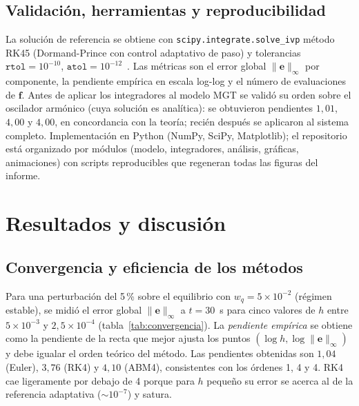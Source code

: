 \documentclass[10pt,a4paper]{article}
\begin{document}
\subsection{Validación, herramientas y reproducibilidad}

La solución de referencia se obtiene con
\texttt{scipy.integrate.solve\_ivp} método RK45 (Dormand-Prince con
control adaptativo de paso) y tolerancias $\texttt{rtol}=10^{-10}$,
$\texttt{atol}=10^{-12}$~\cite{scipy}. Las métricas son el error global
$\|\mathbf{e}\|_\infty$ por componente, la pendiente empírica en escala
log-log y el número de evaluaciones de $\mathbf{f}$. Antes de aplicar
los integradores al modelo MGT se validó su orden sobre el oscilador
armónico (cuya solución es analítica): se obtuvieron pendientes
$1{,}01$, $4{,}00$ y $4{,}00$, en concordancia con la teoría; recién
después se aplicaron al sistema completo. Implementación en Python
(NumPy, SciPy, Matplotlib); el repositorio está organizado por módulos
(modelo, integradores, análisis, gráficas, animaciones) con scripts
reproducibles que regeneran todas las figuras del informe.

\section{Resultados y discusión}
\label{sec:resultados}

\subsection{Convergencia y eficiencia de los métodos}

Para una perturbación del 5\,\% sobre el equilibrio con
$w_q=5\times 10^{-2}$ (régimen estable), se midió el error global
$\|\mathbf{e}\|_\infty$ a $t=30$~s para cinco valores de $h$ entre
$5\times 10^{-3}$ y $2{,}5\times 10^{-4}$ (tabla~\ref{tab:convergencia}).
La \textit{pendiente empírica} se obtiene como la pendiente de la recta
que mejor ajusta los puntos $(\log h, \log\|\mathbf{e}\|_\infty)$ y debe
igualar el orden teórico del método. Las pendientes obtenidas son
$1{,}04$ (Euler), $3{,}76$ (RK4) y $4{,}10$ (ABM4), consistentes con los
órdenes 1, 4 y 4. RK4 cae ligeramente por debajo de 4 porque para $h$
pequeño su error se acerca al de la referencia adaptativa
($\sim 10^{-7}$) y satura.
\end{document}
